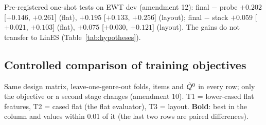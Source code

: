 \begin{center}
\small
{}
\end{center}

\noindent Pre-registered one-shot tests on EWT dev (amendment 12): final $-$ probe $+0.202$ [$+0.146$, $+0.261$] (flat),
$+0.195$ [$+0.133$, $+0.256$] (layout); final $-$ stack $+0.059$ [$+0.021$, $+0.103$] (flat), $+0.075$ [$+0.030$,
$+0.121$] (layout). The gains do not transfer to LinES (Table~\ref{tab:hypotheses}).

\subsection{Controlled comparison of training objectives}
\label{app:objective}
Same design matrix, leave-one-genre-out folds, items and $\tilde{Q}^0$ in every row; only the objective or a second stage
changes (amendment 10). T1 = lower-cased flat features, T2 = cased flat (the flat evaluator), T3 = layout.
\textbf{Bold}: best in the column and values within 0.01 of it (the last two rows are paired differences).


